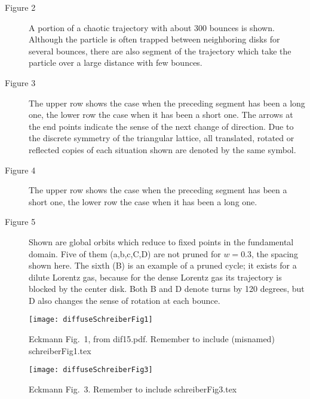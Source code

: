 \begin{description}

\item[Figure 2]
 A portion of a chaotic trajectory with about 300 bounces is shown.
Although the particle is often trapped between neighboring disks
for several bounces, there are also
segment of the trajectory
which take the particle over a large distance with few bounces.

\item[Figure 3]
The upper row shows the case when the preceding
segment has been a long one,
the lower row the case when it has been a short one.
The arrows at the end points
indicate the sense of the next change of direction.
Due to the discrete symmetry of the triangular lattice,
all translated, rotated or reflected copies of each
situation shown are denoted by the same symbol.

\item[Figure 4]
The upper row shows the case when the preceding
segment has been a short one,
the lower row the case when it has been a long one.

 \item[Figure 5]
Shown are global orbits which reduce to fixed points in the fundamental
domain. Five of them (a,b,c,C,D) are not pruned for $w=0.3$,
the spacing shown here. The sixth (B) is an example of a pruned
cycle; it exists for a dilute Lorentz gas, because
for the dense Lorentz gas its trajectory is blocked by the center
disk. Both B and D denote turns by 120 degrees, but
D also changes the sense of rotation at each bounce.
\end{description}

\begin{figure}
\begin{center}
\texttt{[image: diffuseSchreiberFig1]}
\end{center}
\caption{
Eckmann Fig.~1, from dif15.pdf. Remember to include
(misnamed) schreiberFig1.tex
    }
\label{schreiberFig1}
\end{figure}

\begin{figure}
\begin{center}
\texttt{[image: diffuseSchreiberFig3]}
\end{center}
\caption{
Eckmann Fig.~3. Remember to include
schreiberFig3.tex
    }
\label{schreiberFig3}
\end{figure}


